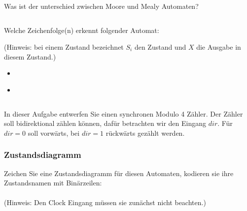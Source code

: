 \newpage
{}
\subsection{}
Was ist der unterschied zwischen Moore und Mealy Automaten?\\
\subsection{}
Welche Zeichenfolge(n) erkennt folgender Automat:\\
\begin{center}
\end{center}
(Hinweis: bei einem Zustand  bezeichnet $S_i$ den Zustand und $X$ die Ausgabe in diesem Zustand.)\\
\begin{itemize}
	\item {}\\
	\item {}
\end{itemize}
\subsection{}
In dieser Aufgabe entwerfen Sie einen synchronen Modulo 4 Zähler. Der Zähler soll bidirektional zählen können, dafür betrachten wir den Eingang $dir$. Für $dir=0$ soll vorwärts, bei $dir=1$ rückwärts gezählt werden.\noindent
\subsubsection{Zustandsdiagramm}
Zeichen Sie eine Zustandsdiagramm für diesen Automaten, kodieren sie ihre Zustandsnamen mit Binärzeilen:\\
\\[0.3cm]
(Hinweis: Den Clock Eingang müssen sie zunächst nicht beachten.)\noindent
